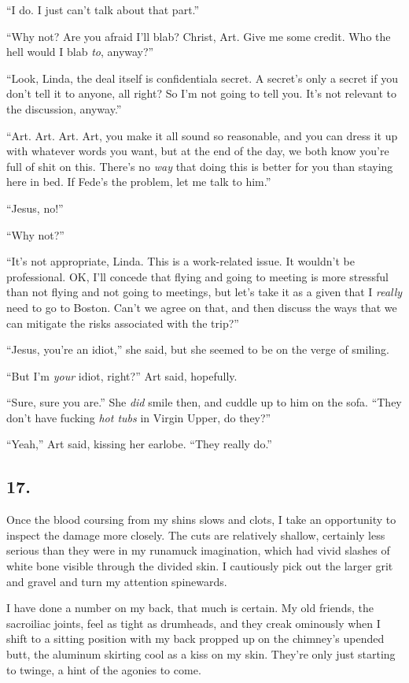 “I do. I just can’t talk about that part.”

“Why not? Are you afraid I’ll blab? Christ, Art. Give me some
credit. Who the hell would I blab \emph{to}, anyway?”

“Look, Linda, the deal itself is confidential{\dash}a secret. A secret’s
only a secret if you don’t tell it to anyone, all right? So I’m not
going to tell you. It’s not relevant to the discussion, anyway.”

“Art. Art. Art. Art, you make it all sound so reasonable, and you
can dress it up with whatever words you want, but at the end of the
day, we both know you’re full of shit on this. There’s no
\emph{way} that doing this is better for you than staying here in
bed. If Fede’s the problem, let me talk to him.”

“Jesus, no!”

“Why not?”

“It’s not appropriate, Linda. This is a work-related issue. It
wouldn’t be professional. OK, I’ll concede that flying and going to
meeting is more stressful than not flying and not going to
meetings, but let’s take it as a given that I \emph{really} need to
go to Boston. Can’t we agree on that, and then discuss the ways
that we can mitigate the risks associated with the trip?”

“Jesus, you’re an idiot,” she said, but she seemed to be on the
verge of smiling.

“But I’m \emph{your} idiot, right?” Art said, hopefully.

“Sure, sure you are.” She \emph{did} smile then, and cuddle up to
him on the sofa. “They don’t have fucking \emph{hot tubs} in Virgin
Upper, do they?”

“Yeah,” Art said, kissing her earlobe. “They really do.”

\subsection{17.}

Once the blood coursing from my shins slows and clots, I take an
opportunity to inspect the damage more closely. The cuts are
relatively shallow, certainly less serious than they were in my
runamuck imagination, which had vivid slashes of white bone visible
through the divided skin. I cautiously pick out the larger grit and
gravel and turn my attention spinewards.

I have done a number on my back, that much is certain. My old
friends, the sacroiliac joints, feel as tight as drumheads, and
they creak ominously when I shift to a sitting position with my
back propped up on the chimney’s upended butt, the aluminum
skirting cool as a kiss on my skin. They’re only just starting to
twinge, a hint of the agonies to come.

